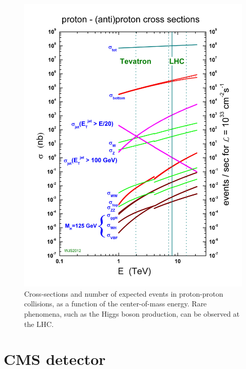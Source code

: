 \begin{figure}[!htb]
  \centering
    \includegraphics[width=.5\textwidth]{figures/crosssections2013.jpg}
  \caption{Cross-sections and number of expected events in proton-proton collisions, as a function of the center-of-mass energy. Rare phenomena, such as the Higgs boson production, can be observed at the LHC.}
  \label{fig:LHC_pp_cross_section}
\end{figure}

\section{CMS detector}

